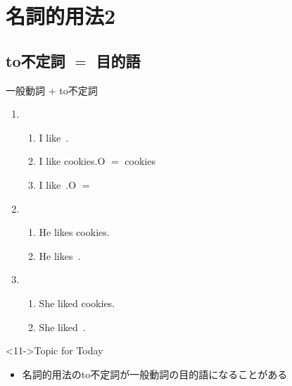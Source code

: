 \documentclass[aspectratio=169,xcolor={dvipsnames,table}]{beamer}
\begin{document}
\section{名詞的用法2}
\subsection{to不定詞 $=$ 目的語}
\begin{frame}[plain]{一般動詞 $+$ to不定詞}
\large 

\begin{enumerate}
 \item \begin{enumerate}
	\item<1-> I like \,.%
	\item<2-> I like cookies.\hfill{}O $=$ cookies
	\item<3-> I like \,.\hfill{}O $=$ 
       \end{enumerate}
 \item \begin{enumerate}
	\item<5-> He likes cookies.
	\item<6-> He likes \,.
       \end{enumerate}
 \item \begin{enumerate}
	\item<8-> She liked cookies.
	\item<9-> She liked \,.
       \end{enumerate} 
\end{enumerate}

\vspace*{40pt}

\begin{block}<11->{Topic for Today}
\begin{itemize}[square]\small
 \item<11->   名詞的用法のto不定詞が一般動詞の目的語になることがある
 \end{itemize}
     \end{block}


\end{frame}
\end{document}
